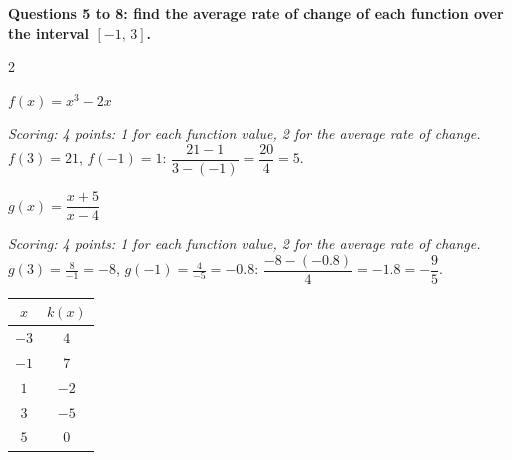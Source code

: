\begin{center}\textsf{\small\bfseries\color{apnavy}Questions 5 to 8: find the average rate of change of each function over the interval $[-1,\,3]$.}\end{center}
\begin{multicols}{2}\raggedcolumns
\noindent\begin{minipage}{\linewidth}
\begin{exo}{}
$f(x)=x^3-2x$
\ifkey\else\vspace{1.6cm}\fi
\begin{solution}
\textit{Scoring: 4 points: 1 for each function value, 2 for the average rate of change.}\\
$f(3)=21$, $f(-1)=1$: $\dfrac{21-1}{3-(-1)}=\dfrac{20}{4}=5$.
\end{solution}
\end{exo}
\end{minipage}\par\vspace{8pt}
\noindent\begin{minipage}{\linewidth}
\begin{exo}{}
$g(x)=\dfrac{x+5}{x-4}$
\ifkey\else\vspace{1.6cm}\fi
\begin{solution}
\textit{Scoring: 4 points: 1 for each function value, 2 for the average rate of change.}\\
$g(3)=\frac{8}{-1}=-8$, $g(-1)=\frac{4}{-5}=-0.8$: $\dfrac{-8-(-0.8)}{4}=-1.8=-\dfrac95$.
\end{solution}
\end{exo}
\end{minipage}\par\vspace{8pt}
\noindent\begin{minipage}{\linewidth}
\begin{exo}{}
\begin{center}\begin{tabular}{|c|c|}\hline$x$&$k(x)$\\\hline$-3$&$4$\\\hline$-1$&$7$\\\hline$1$&$-2$\\\hline$3$&$-5$\\\hline$5$&$0$\\\hline\end{tabular}\end{center}
\ifkey\else\vspace{0.6cm}\fi

\end{exo}
\end{minipage}
\end{multicols}
